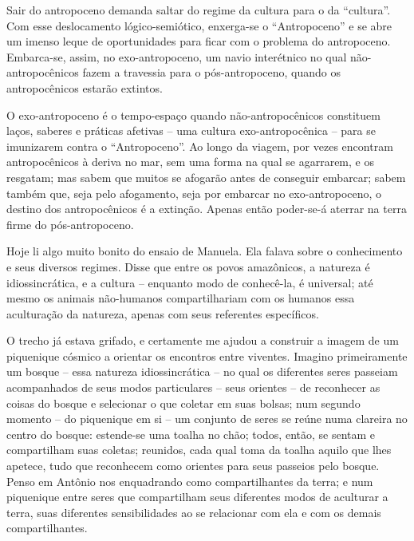 Sair do antropoceno demanda saltar do regime da cultura para o da \enquote{cultura}. Com esse deslocamento lógico-semiótico, enxerga-se o \enquote{Antropoceno} e se abre um imenso leque de oportunidades para ficar com o problema do antropoceno. Embarca-se, assim, no exo-antropoceno, um navio interétnico no qual não-antropocênicos fazem a travessia para o pós-antropoceno, quando os antropocênicos estarão extintos.

O exo-antropoceno é o tempo-espaço quando não-antropocênicos constituem laços, saberes e práticas afetivas -- uma cultura exo-antropocênica -- para se imunizarem contra o \enquote{Antropoceno}. Ao longo da viagem, por vezes encontram antropocênicos à deriva no mar, sem uma forma na qual se agarrarem, e os resgatam; mas sabem que muitos se afogarão antes de conseguir embarcar; sabem também que, seja pelo afogamento, seja por embarcar no exo-antropoceno, o destino dos antropocênicos é a extinção. Apenas então poder-se-á aterrar na terra firme do pós-antropoceno.


Hoje li algo muito bonito do ensaio de Manuela. Ela falava sobre o conhecimento e seus diversos regimes. Disse que entre os povos amazônicos, a natureza é idiossincrática, e a cultura -- enquanto modo de conhecê-la, é universal; até mesmo os animais não-humanos compartilhariam com os humanos essa aculturação da natureza, apenas com seus referentes específicos.

O trecho já estava grifado, e certamente me ajudou a construir a imagem de um piquenique cósmico a orientar os encontros entre viventes. Imagino primeiramente um bosque -- essa natureza idiossincrática -- no qual os diferentes seres passeiam acompanhados de seus modos particulares -- seus orientes -- de reconhecer as coisas do bosque e selecionar o que coletar em suas bolsas; num segundo momento -- do piquenique em si -- um conjunto de seres se reúne numa clareira no centro do bosque: estende-se uma toalha no chão; todos, então, se sentam e compartilham suas coletas; reunidos, cada qual toma da toalha aquilo que lhes apetece, tudo que reconhecem como orientes para seus passeios pelo bosque. Penso em Antônio nos enquadrando como compartilhantes da terra; e num piquenique entre seres que compartilham seus diferentes modos de aculturar a terra, suas diferentes sensibilidades ao se relacionar com ela e com os demais compartilhantes.

